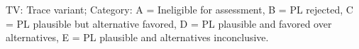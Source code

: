 \begin{center}\footnotesize
TV: Trace variant; \quad Category: A = Ineligible for assessment, B = PL rejected, C = PL plausible but alternative favored, D = PL plausible and favored over alternatives, E = PL plausible and alternatives inconclusive.
\end{center}

